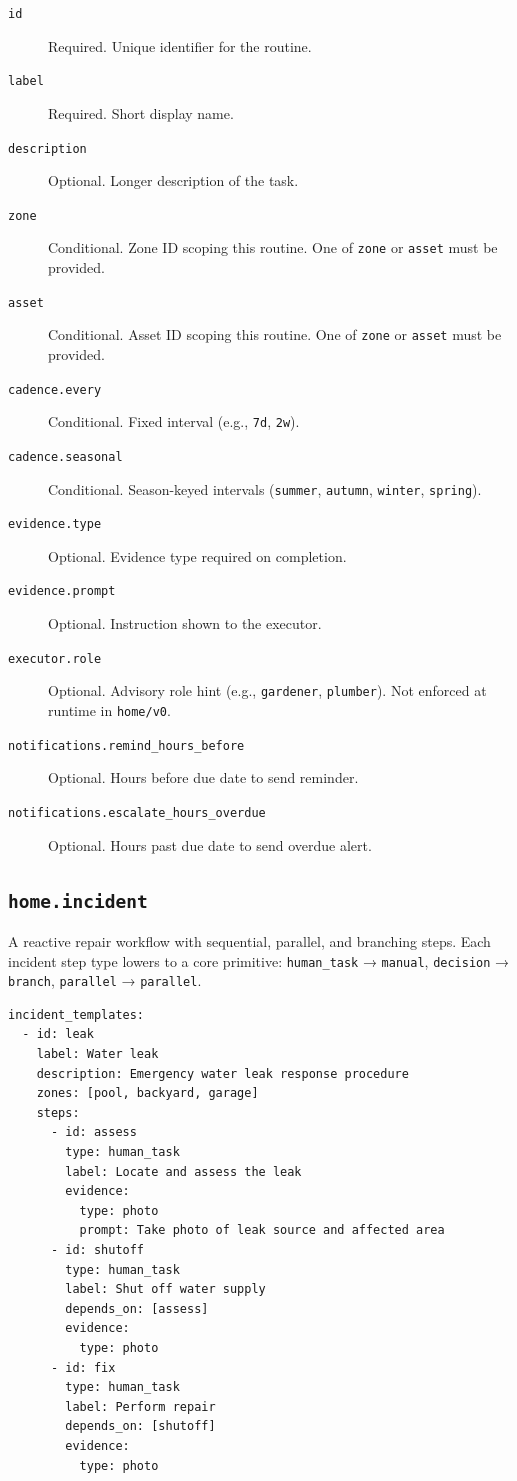 \begin{description}
  \item[\texttt{id}] Required. Unique identifier for the routine.
  \item[\texttt{label}] Required. Short display name.
  \item[\texttt{description}] Optional. Longer description of the task.
  \item[\texttt{zone}] Conditional. Zone ID scoping this routine. One of \texttt{zone} or
        \texttt{asset} must be provided.
  \item[\texttt{asset}] Conditional. Asset ID scoping this routine. One of \texttt{zone} or
        \texttt{asset} must be provided.
  \item[\texttt{cadence.every}] Conditional. Fixed interval (e.g., \texttt{7d}, \texttt{2w}).
  \item[\texttt{cadence.seasonal}] Conditional. Season-keyed intervals
        (\texttt{summer}, \texttt{autumn}, \texttt{winter}, \texttt{spring}).
  \item[\texttt{evidence.type}] Optional. Evidence type required on completion.
  \item[\texttt{evidence.prompt}] Optional. Instruction shown to the executor.
  \item[\texttt{executor.role}] Optional. Advisory role hint (e.g., \texttt{gardener},
        \texttt{plumber}). Not enforced at runtime in \texttt{home/v0}.
  \item[\texttt{notifications.remind\_hours\_before}] Optional. Hours before due date to
        send reminder.
  \item[\texttt{notifications.escalate\_hours\_overdue}] Optional. Hours past due date to
        send overdue alert.
\end{description}

\subsection{\texttt{home.incident}}

A reactive repair workflow with sequential, parallel, and branching steps. Each incident
step type lowers to a core primitive: \texttt{human\_task} → \texttt{manual},
\texttt{decision} → \texttt{branch}, \texttt{parallel} → \texttt{parallel}.

\begin{verbatim}
incident_templates:
  - id: leak
    label: Water leak
    description: Emergency water leak response procedure
    zones: [pool, backyard, garage]
    steps:
      - id: assess
        type: human_task
        label: Locate and assess the leak
        evidence:
          type: photo
          prompt: Take photo of leak source and affected area
      - id: shutoff
        type: human_task
        label: Shut off water supply
        depends_on: [assess]
        evidence:
          type: photo
      - id: fix
        type: human_task
        label: Perform repair
        depends_on: [shutoff]
        evidence:
          type: photo
\end{verbatim}

